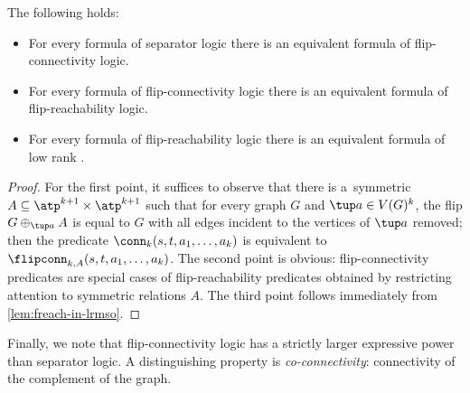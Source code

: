 \begin{proposition}\label{lem:easy-comparison}
 The following holds:
 \begin{itemize}[nosep]
  \item For every formula of separator logic there is an equivalent formula of flip-connectivity logic.
  \item For every formula of flip-connectivity logic there is an equivalent formula of flip-reachability logic.
  \item For every formula of flip-reachability logic there is an equivalent formula of low rank \mso.
 \end{itemize}
\end{proposition}
\begin{proof}
 For the first point, it suffices to observe that there is a~symmetric $A\subseteq \atp^{k+1} \times \atp^{k+1}$ such that for every graph $G$ and $\tup a\in V(G)^k$, the flip $G\oplus_{\tup a} A$ is equal to $G$ with all edges incident to the vertices of $\tup a$ removed; then the predicate $\conn_k(s,t,a_1,\ldots,a_k)$ is equivalent to $\flipconn_{k,A}(s,t,a_1,\ldots,a_k)$. The second point is obvious: flip-connectivity predicates are special cases of flip-reachability predicates obtained by restricting attention to symmetric relations $A$. The third point follows immediately from \cref{lem:freach-in-lrmso}.
\end{proof}

Finally, we note that flip-connectivity logic has a strictly larger expressive power than separator logic. A distinguishing property is {\em{co-connectivity}}: connectivity of the complement of the graph.

